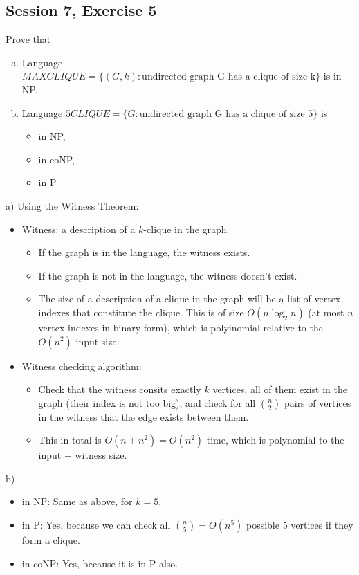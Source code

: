 \subsection {Session 7, Exercise 5}


Prove that
\begin{enumerate}[a)]
\item Language $MAXCLIQUE = \{(G,k) : \text{undirected graph G has a clique of size k}\}$ is in NP.
\item Language $5CLIQUE = \{G : \text{undirected graph G has a clique of size 5}\}$ is
    \begin{itemize}
        \item in NP,
        \item in coNP,
        \item in P
    \end{itemize}
\end{enumerate}


a) Using the Witness Theorem:

\begin{itemize}
    \item Witness: a description of a $k$-clique in the graph.
    \begin{itemize}
        \item If the graph is in the language, the witness exists.
        \item If the graph is not in the language, the witness doesn't exist.
        \item The size of a description of a clique in the graph will be a list of vertex indexes that constitute the clique. This is of size $O(n\log_2n)$ (at most $n$ vertex indexes in binary form), which is polyinomial relative to the $O(n^2)$ input size.
    \end{itemize}
    \item Witness checking algorithm:
    \begin{itemize}
        \item Check that the witness consits exactly $k$ vertices, all of them exist in the graph (their index is not too big), and check for all $\binom{n}{2}$ pairs of vertices in the witness that the edge exists between them.
        \item This in total is $O(n+n^2) = O(n^2)$ time, which is polynomial to the input + witness size.
    \end{itemize}
\end{itemize}

b)

\begin{itemize}
    \item in NP: Same as above, for $k=5$.
    \item in P: Yes, because we can check all $\binom{n}{5} = O(n^5)$ possible 5 vertices if they form a clique.
    \item in coNP: Yes, because it is in P also.
\end{itemize}
